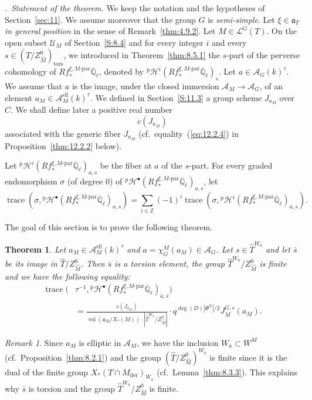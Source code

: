 \documentclass[12pt,a4paper,oneside,english,leqno]{smfart}
\makeatletter
\numberwithin{equation}{subsection}
\newcounter{theo}
\numberwithin{theo}{subsection}
\newenvironment{paragr}[1][]{\medskip\refstepcounter{subsection}%
  \par\noindent\hspace*{\parindent}\thesubsection.\ \emph{#1}%
  \@ifundefined{@empty}{}{}\ignorespaces}{\medskip}
\theoremstyle{plain}
\newtheorem{theorem}[theo]{Theorem}
\theoremstyle{definition}
\theoremstyle{remark}
\newtheorem{remark}[theo]{Remark}
\DeclareMathOperator{\vol}{vol}
\DeclareMathOperator{\der}{der}
\DeclareMathOperator{\el}{ell}
\DeclareMathOperator{\trace}{trace}
\DeclareMathOperator{\tors}{tors}
\newcommand{\ZZ}{\mathbb{Z}}
\newcommand{\Qlb}{\overline{\mathbb{Q}}_{\ell}}
\newcommand{\uc}{\mathcal{U}}
\newcommand{\lc}{\mathcal{L}}
\newcommand{\hc}{\mathcal{H}}
\newcommand{\Ac}{\mathcal{A}}
\newcommand{\Tc}{\widehat{T}}
\newcommand{\Mc}{\widehat{M}}
\newcommand{\ago}{\mathfrak{a}}
\makeatother
\begin{document}
\begin{paragr}[Statement of the theorem.]\label{S:12.1}
We keep the notation and the hypotheses of Section~\ref{sec:11}. We assume moreover that the group $G$ is \emph{semi-simple}. Let $\xi\in\ago_T$ \emph{in general position} in the sense of Remark~\ref{thm:4.9.2}. Let $M\in\lc^G(T)$. On the open subset $\uc_M$ of Section~\ref{S:8.4} and for every integer $i$ and every $s\in(\Tc/Z^0_{\Mc})_{\tors}$, we introduced in Theorem~\ref{thm:8.5.1} the $s$-part of the perverse cohomology of $Rf_*^{\xi,M\text{-par}}\Qlb$, denoted by ${}^{\mathrm p}\hc^i(Rf_*^{\xi,M\text{-par}}\Qlb)_s$. Let $a\in\Ac_G(k)^\tau$. We assume that $a$ is the image, under the closed immersion $\Ac_M\to\Ac_G$, of an element $a_M\in\Ac_M^{\el}(k)^\tau$. We defined in Section~\ref{S:11.3} a group scheme $J_{a_M}$ over $C$. We shall define later a positive real number
$$
c(J_{a_M})
$$
associated with the generic fiber $J_{a_M}$ (cf.\ equality~(\ref{eq:12.2.4}) in Proposition~\ref{thm:12.2.2} below).

Let ${}^{\mathrm p}\hc^i(Rf_*^{\xi,M\text{-par}}\Qlb)_{a,s}$ be the fiber at $a$ of the $s$-part. For every graded endomorphism $\sigma$ (of degree $0$) of ${}^{\mathrm p}\hc^\bullet(Rf_*^{\xi,M\text{-par}}\Qlb)_{a,s}$, let
$$
\trace(\sigma,{}^{\mathrm p}\hc^\bullet(Rf_*^{\xi,M\text{-par}}\Qlb)_{a,s}) =\sum_{i\in\ZZ}(-1)^i \trace(\sigma,{}^{\mathrm p}\hc^i(Rf_*^{\xi,M\text{-par}}\Qlb)_{a,s}).
$$

The goal of this section is to prove the following theorem.

\begin{theorem}\label{thm:12.1.1}
Let $a_M\in\Ac_M^{\el}(k)^\tau$ and $a=\chi_G^M(a_M)\in\Ac_G$. Let $s\in\Tc^{W_a}$ and let $\bar{s}$ be its image in $\Tc/Z^0_{\Mc}$. Then $\bar{s}$ is a torsion element, the group $\Tc^{W_a}/Z^0_{\Mc}$ is finite and we have the following equality:
\begin{align*}
\trace(&\tau^{-1},{}^{\mathrm p}\hc^\bullet(Rf_*^{\xi,M\text{-par}}\Qlb)_{a,\bar{s}})\\
&=\frac{c(J_{a_M})}{\vol(\ago_M/X_*(M))\cdot|\Tc^{W_a}/Z^0_{\Mc}|}
\cdot q^{\deg(D)|\Phi^G|/2}J_M^{G,s}(a_M).
\end{align*}
\end{theorem}

\begin{remark}\label{thm:12.1.2}
Since $a_M$ is elliptic in $\Ac_M$, we have the inclusion $W_a\subset W^M$ (cf.\ Proposition~\ref{thm:8.2.1}) and the group $(\Tc/Z^0_{\Mc})^{W_a}$ is finite since it is the dual of the finite group $X_*(T\cap M_{\der})_{W_a}$ (cf.\ Lemma~\ref{thm:8.3.3}). This explains why $\bar{s}$ is torsion and the group $\Tc^{W_a}/Z^0_{\Mc}$ is finite.
\end{remark}


\end{paragr}
\end{document}
